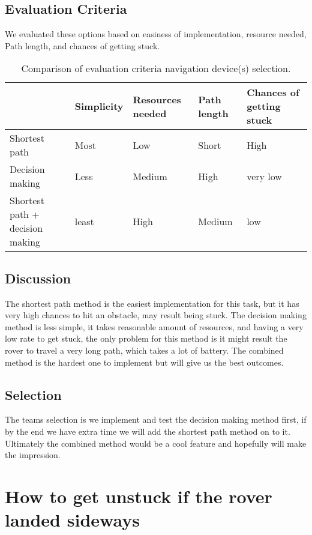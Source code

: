 \documentclass[10pt,serif,draftclsnofoot,onecolumn]{IEEEtran}
\begin{document}
\subsection{Evaluation Criteria}
We evaluated these options based on easiness of implementation, resource needed, Path length, and chances of getting stuck. 

\begin{table}[h!]
  \centering
  \caption{Comparison of evaluation criteria navigation device(s) selection.}
  \label{tab:table1}
  \begin{tabular}{l|l|l|l|l}
	                         & Simplicity  &Resources needed   & Path length & Chances of getting stuck  \\
    \hline
    Shortest path          	& Most      	& Low			 & Short  & High \\
    \hline
    Decision making        	& Less       	&Medium   	     & High  & very low \\
    \hline
	Shortest path + decision making& least     	& High           & Medium    &  low	\\
  \end{tabular}
\end{table}

\subsection{Discussion}
The shortest path method is the easiest implementation for this task, but it has very high chances to hit an obstacle, may result being stuck. The decision making method is less simple, it takes reasonable amount of resources, and having a very low rate to get stuck, the only problem for this method is it might result the rover to travel a very long path, which takes a lot of battery. The combined method is the hardest one to implement but will give us the best outcomes. 

\subsection{Selection}
The teams selection is we implement and test the decision making method first, if by the end we have extra time we will add the shortest path method on to it. Ultimately the combined method would be a cool feature and hopefully will make the impression. 
	
\section{How to get unstuck if the rover landed sideways}
\end{document}
